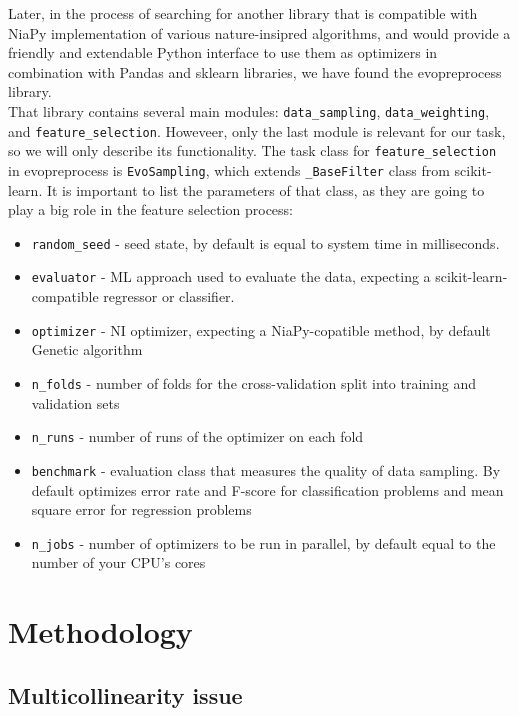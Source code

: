 \documentclass[conference]{IEEEtran}
\begin{document}
Later, in the process of searching for another library that is compatible with NiaPy implementation of various nature-insipred algorithms, and would provide a friendly and extendable Python interface to use them as optimizers in combination with Pandas and sklearn libraries, we have found the evopreprocess library\cite{evopreproc}. \\

That library contains several main modules: \texttt{data\_sampling}, \texttt{data\_weighting}, and \texttt{feature\_selection}. Howeveer, only the last module is relevant for our task, so we will only describe its functionality. The task class for \texttt{feature\_selection} in evopreprocess is \texttt{EvoSampling}, which extends \texttt{\_BaseFilter} class from scikit-learn. It is important to list the parameters of that class, as they are going to play a big role in the feature selection process:
\begin{itemize}
	\item \texttt{random\_seed} - seed state, by default is equal to system time in milliseconds.
	\item \texttt{evaluator} - ML approach used to evaluate the data, expecting a scikit-learn-compatible regressor or classifier.
	\item \texttt{optimizer} - NI optimizer, expecting a NiaPy-copatible method, by default Genetic algorithm
	\item \texttt{n\_folds} - number of folds for the cross-validation split into training and validation sets
	\item \texttt{n\_runs} - number of runs of the optimizer on each fold
	\item \texttt{benchmark} - evaluation class that measures the quality of data sampling. By default optimizes error rate and F-score for classification problems and mean square error for regression problems
	\item \texttt{n\_jobs} - number of optimizers to be run in parallel, by default equal to the number of your CPU's cores
\end{itemize}



\section{Methodology}

\subsection{Multicollinearity issue}
\end{document}
